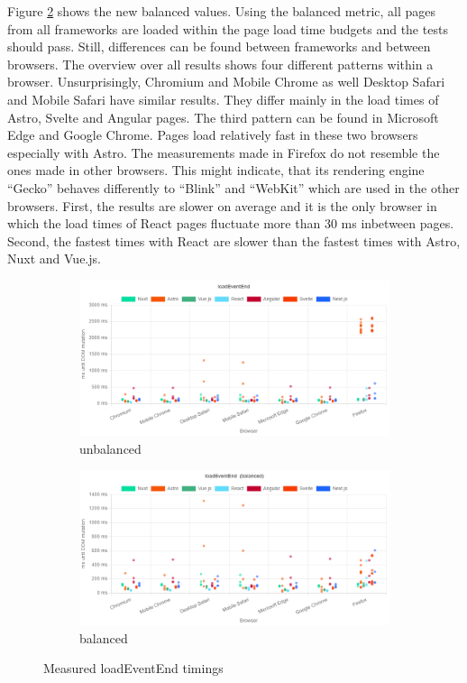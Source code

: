 \documentclass[a4paper, 12pt]{article}
\begin{document}
Figure \ref{subfig:Playwright:loadEventEnd:balanced} shows the new balanced values.
Using the balanced metric, all pages from all frameworks are loaded within the page load time budgets and the tests should pass.
Still, differences can be found between frameworks and between browsers.
The overview over all results shows four different patterns within a browser.
Unsurprisingly, Chromium and Mobile Chrome as well Desktop Safari and Mobile Safari have similar results.
They differ mainly in the load times of Astro, Svelte and Angular pages.
The third pattern can be found in Microsoft Edge and Google Chrome.
Pages load relatively fast in these two browsers especially with Astro.
The measurements made in Firefox do not resemble the ones made in other browsers.
This might indicate, that its rendering engine \enquote{Gecko} behaves differently to \enquote{Blink} and \enquote{WebKit} which are used in the other browsers.
First, the results are slower on average and it is the only browser in which the load times of React pages fluctuate more than 30 ms inbetween pages.
Second, the fastest times with React are slower than the fastest times with Astro, Nuxt and Vue.js.

\begin{figure}
  \centering
  \begin{subfigure}{\linewidth}
    \includegraphics[width=\linewidth, keepaspectratio]{img/playwright-results/loadEventEnd/total.png}
    \caption{unbalanced}\label{subfig:Playwright:loadEventEnd:unbalanced}
  \end{subfigure}
  \begin{subfigure}{\linewidth}
    \includegraphics[width=\linewidth, keepaspectratio]{img/playwright-results/loadEventEnd_balanced/total.png}
    \caption{balanced}\label{subfig:Playwright:loadEventEnd:balanced}
  \end{subfigure}
  \caption{Measured loadEventEnd timings}
  \label{fig:Playwright:loadEventEnd}
\end{figure}
\end{document}
